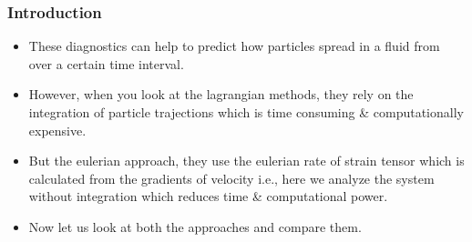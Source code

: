 \documentclass[../presentation.tex]{subfiles}
\begin{document}

\begin{frame}
  \frametitle{Introduction}

  \begin{itemize}
    \item These diagnostics can help to predict how particles spread in a fluid from over a certain time interval.
    
    \item However, when you look at the lagrangian methods, they rely on the integration of particle trajections which is time consuming \& computationally expensive.
    
    \item But the eulerian approach, they use the eulerian rate of strain tensor which is calculated from the gradients of velocity i.e., here we analyze the system without integration which reduces time \& computational power. \par 

    \item Now let us look at both the approaches and compare them.
  \end{itemize}
  

\end{frame}
\end{document}
